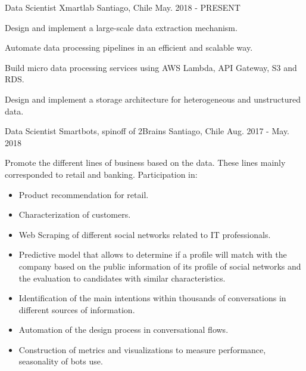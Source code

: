 

\begin{cventries}

  \cventry
    {Data Scientist} %
    {Xmartlab} %
    {Santiago, Chile} %
    {May. 2018 - PRESENT} %
    {
      \begin{cvitems} %
        \item {Design and implement a large-scale data extraction mechanism.}
        \item {Automate data processing pipelines in an efficient and scalable way.}
        \item {Build micro data processing services using AWS Lambda, API Gateway, S3 and RDS.}
        \item {Design and implement a storage architecture for heterogeneous and unstructured data.}
      \end{cvitems}
    }
  \cventry
    {Data Scientist} %
    {Smartbots, spinoff of 2Brains} %
    {Santiago, Chile} %
    {Aug. 2017 - May. 2018} %
    {
      \begin{cvitems} %
        \item {Promote the different lines of business based on the data. These lines mainly corresponded to retail and banking. Participation in:}
      	\begin{itemize}
        	\item{Product recommendation for retail.}
        	\item{Characterization of customers.}
        	\item{Web Scraping of different social networks related to IT professionals.}
        	\item{Predictive model that allows to determine if a profile will match with the company based on the public information of its profile of social networks and the evaluation to candidates with similar characteristics.}
        	\item{Identification of the main intentions within thousands of conversations in different sources of information.}
        	\item{Automation of the design process in conversational flows.}
        	\item{Construction of metrics and visualizations to measure performance, seasonality of bots use.}
      	\end{itemize}
      \end{cvitems}
    }


\end{cventries}
